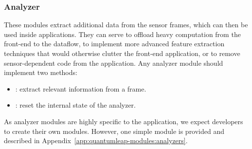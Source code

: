 \subsubsection{Analyzer}
These modules extract additional data from the sensor frames, which can then be used inside applications. They can serve to offload heavy computation from the front-end to the \ql dataflow, to implement more advanced feature extraction techniques that would otherwise clutter the front-end application, or to remove sensor-dependent code from the application. Any analyzer module should implement two methods:
\begin{itemize}[noitemsep]
    \item {}: extract relevant information from a frame.
    \item {}: reset the internal state of the analyzer.
\end{itemize}
As analyzer modules are highly specific to the application, we expect developers to create their own modules. However, one simple module is provided and described in Appendix~\ref{app:quantumleap-modules:analyzers}.

